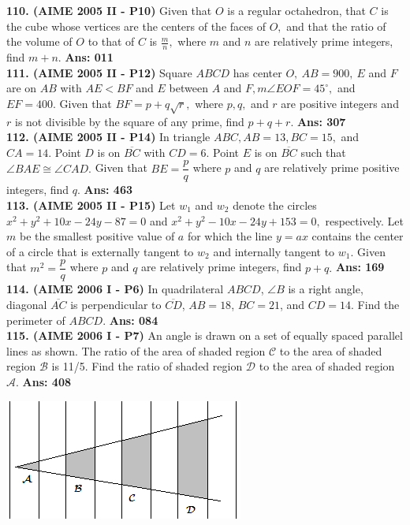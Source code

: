\documentclass[letterpaper,10pt,addpoints]{exam}
\begin{document}
\textbf{110. (AIME 2005 II - P10) }   Given that $O$ is a regular octahedron, that $C$ is the cube whose vertices are the centers of the faces of $O,$ and that the ratio of the volume of $O$ to that of $C$ is $\frac mn,$ where $m$ and $n$ are relatively prime integers, find $m+n.$  \quad\textbf{Ans: 011}\\

\textbf{111. (AIME 2005 II - P12) }   Square $ABCD$ has center $O,\ AB=900,\ E$ and $F$ are on $AB$ with $AE<BF$ and $E$ between $A$ and $F, m\angle EOF =45^\circ,$ and $EF=400.$ Given that $BF=p+q\sqrt{r},$ where $p,q,$ and $r$ are positive integers and $r$ is not divisible by the square of any prime, find $p+q+r.$  \quad\textbf{Ans: 307}\\

\textbf{112. (AIME 2005 II - P14) }   In triangle $ABC, AB=13, BC=15,$ and $CA = 14.$ Point $D$ is on $\overline{BC}$ with $CD=6.$ Point $E$ is on $\overline{BC}$ such that $\angle BAE\cong \angle CAD.$ Given that $BE=\dfrac{p}{q}$ where $p$ and $q$ are relatively prime positive integers, find $q.$  \quad\textbf{Ans: 463}\\

\textbf{113. (AIME 2005 II - P15) }   Let $w_1$ and $w_2$ denote the circles $x^2+y^2+10x-24y-87=0$ and $x^2 +y^2-10x-24y+153=0,$ respectively. Let $m$ be the smallest positive value of $a$ for which the line $y=ax$ contains the center of a circle that is externally tangent to $w_2$ and internally tangent to $w_1.$ Given that $m^2=\dfrac{p}{q}$ where $p$ and $q$ are relatively prime integers, find $p+q.$  \quad\textbf{Ans: 169}\\

\textbf{114. (AIME 2006 I - P6) }   In quadrilateral $ABCD$, $\angle B$ is a right angle, diagonal $\overline{AC}$ is perpendicular to $\overline{CD}$, $AB=18$, $BC=21$, and $CD=14$. Find the perimeter of $ABCD$.  \quad\textbf{Ans: 084}\\

\textbf{115. (AIME 2006 I - P7) }   An angle is drawn on a set of equally spaced parallel lines as shown. The ratio of the area of shaded region $\mathcal{C}$ to the area of shaded region $\mathcal{B}$ is 11/5. Find the ratio of shaded region $\mathcal{D}$ to the area of shaded region $\mathcal{A}.$  \quad\textbf{Ans: 408 }

\begin{center}
\includegraphics[scale=0.4]{2006AimeA7.PNG}
\end{center}
\end{document}

